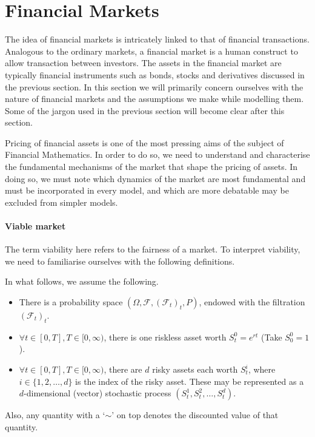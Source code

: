 \section{Financial Markets}
\label{sec:intro-market}

The idea of financial markets is intricately linked to that of financial transactions. Analogous to the ordinary markets, a financial market is a human construct to allow transaction between investors. The assets in the financial market are typically financial instruments such as bonds, stocks and derivatives discussed in the previous section. In this section we will primarily concern ourselves with the nature of financial markets and the assumptions we make while modelling them. Some of the jargon used in the previous section will become clear after this section.

Pricing of financial assets is one of the most pressing aims of the subject of Financial Mathematics. In order to do so, we need to understand and characterise the fundamental mechanisms of the market that shape the pricing of assets. In doing so, we must note which dynamics of the market are most fundamental and must be incorporated in every model, and which are more debatable may be excluded from simpler models.

\paragraph{Viable market}
The term viability here refers to the fairness of a market. To interpret viability, we need to familiarise ourselves with the following definitions.

In what follows, we assume the following.
\begin{itemize}
	\item There is a probability space $ (\Omega, \mathcal{F}, (\mathcal{F}_t)_t, P) $, endowed with the filtration $ (\mathcal{F}_t)_t $.
	\item $ \forall t \in [0, T], T \in [0, \infty) $, there is one riskless asset worth $ S_t^0 = e^{rt} $ (Take $ S_0^0 = 1 $).
	\item $ \forall t \in [0, T], T \in [0, \infty) $, there are $ d $ risky assets each worth $ S_t^i $, where $ i \in \{ 1, 2, \dots, d \} $ is the index of the risky asset. These may be represented as a $ d $-dimensional (vector) stochastic process $ ( S_t^1, S_t^2, \dots, S_t^d ) $.
\end{itemize}

Also, any quantity with a `$ \sim $' on top denotes the discounted value of that quantity.


